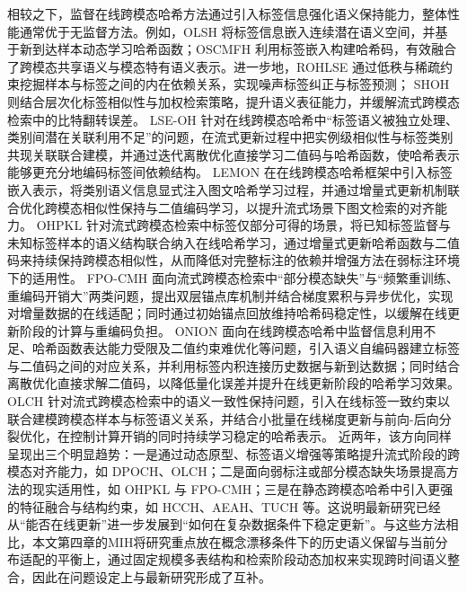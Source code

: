 相较之下，监督在线跨模态哈希方法通过引入标签信息强化语义保持能力，整体性能通常优于无监督方法。例如，OLSH 将标签信息嵌入连续潜在语义空间，并基于新到达样本动态学习哈希函数；OSCMFH 利用标签嵌入构建哈希码，有效融合了跨模态共享语义与模态特有语义表示。进一步地，ROHLSE 通过低秩与稀疏约束挖掘样本与标签之间的内在依赖关系，实现噪声标签纠正与标签预测；
SHOH 则结合层次化标签相似性与加权检索策略，提升语义表征能力，并缓解流式跨模态检索中的比特翻转误差。
LSE-OH 针对在线跨模态哈希中“标签语义被独立处理、类别间潜在关联利用不足”的问题，在流式更新过程中把实例级相似性与标签类别共现关联联合建模，并通过迭代离散优化直接学习二值码与哈希函数，使哈希表示能够更充分地编码标签间依赖结构。
LEMON 在在线跨模态哈希框架中引入标签嵌入表示，将类别语义信息显式注入图文哈希学习过程，并通过增量式更新机制联合优化跨模态相似性保持与二值编码学习，以提升流式场景下图文检索的对齐能力。
OHPKL 针对流式跨模态检索中标签仅部分可得的场景，将已知标签监督与未知标签样本的语义结构联合纳入在线哈希学习，通过增量式更新哈希函数与二值码来持续保持跨模态相似性，从而降低对完整标注的依赖并增强方法在弱标注环境下的适用性。
FPO-CMH 面向流式跨模态检索中“部分模态缺失”与“频繁重训练、重编码开销大”两类问题，提出双层锚点库机制并结合梯度累积与异步优化，实现对增量数据的在线适配；同时通过初始锚点回放维持哈希码稳定性，以缓解在线更新阶段的计算与重编码负担。
ONION 面向在线跨模态哈希中监督信息利用不足、哈希函数表达能力受限及二值约束难优化等问题，引入语义自编码器建立标签与二值码之间的对应关系，并利用标签内积连接历史数据与新到达数据；同时结合离散优化直接求解二值码，以降低量化误差并提升在线更新阶段的哈希学习效果。
OLCH 针对流式跨模态检索中的语义一致性保持问题，引入在线标签一致约束以联合建模跨模态样本与标签语义关系，并结合小批量在线梯度更新与前向-后向分裂优化，在控制计算开销的同时持续学习稳定的哈希表示。
近两年，该方向同样呈现出三个明显趋势：一是通过动态原型、标签语义增强等策略提升流式阶段的跨模态对齐能力，如 DPOCH、OLCH；二是面向弱标注或部分模态缺失场景提高方法的现实适用性，如 OHPKL 与 FPO-CMH；三是在静态跨模态哈希中引入更强的特征融合与结构约束，如 HCCH、AEAH、TUCH 等。这说明最新研究已经从“能否在线更新”进一步发展到“如何在复杂数据条件下稳定更新”。与这些方法相比，本文第四章的MIH将研究重点放在概念漂移条件下的历史语义保留与当前分布适配的平衡上，通过固定规模多表结构和检索阶段动态加权来实现跨时间语义整合，因此在问题设定上与最新研究形成了互补。

